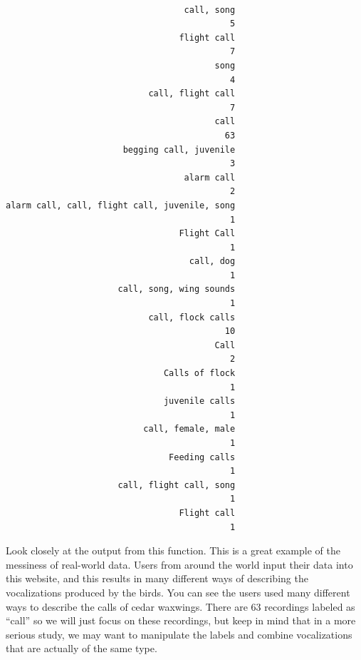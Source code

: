 \documentclass[]{krantz}
\begin{document}
\begin{verbatim}

                                   call, song 
                                            5 
                                  flight call 
                                            7 
                                         song 
                                            4 
                            call, flight call 
                                            7 
                                         call 
                                           63 
                       begging call, juvenile 
                                            3 
                                   alarm call 
                                            2 
alarm call, call, flight call, juvenile, song 
                                            1 
                                  Flight Call 
                                            1 
                                    call, dog 
                                            1 
                      call, song, wing sounds 
                                            1 
                            call, flock calls 
                                           10 
                                         Call 
                                            2 
                               Calls of flock 
                                            1 
                               juvenile calls 
                                            1 
                           call, female, male 
                                            1 
                                Feeding calls 
                                            1 
                      call, flight call, song 
                                            1 
                                  Flight call 
                                            1 
\end{verbatim}

Look closely at the output from this function. This is a great example
of the messiness of real-world data. Users from around the world input
their data into this website, and this results in many different ways of
describing the vocalizations produced by the birds. You can see the
users used many different ways to describe the calls of cedar waxwings.
There are 63 recordings labeled as ``call'' so we will just focus on
these recordings, but keep in mind that in a more serious study, we may
want to manipulate the labels and combine vocalizations that are
actually of the same type.
\end{document}
